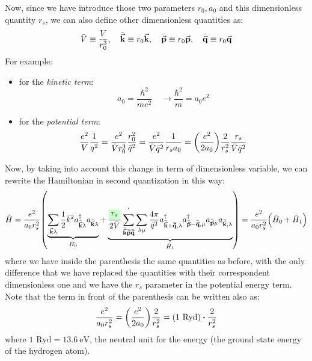 \documentclass[../main/main.tex]{subfiles}
\begin{document}
Now, since we have introduce those two parameters \( r_0,a_0 \) and this dimensionless quantity \( r_s \), we can also define other dimensionless quantities as:
\begin{equation*}
  \bar{V} \equiv \frac{V}{r_0^3}, \quad \bar{\va{k}} \equiv r_0 \va{k}, \quad  \bar{\va{p}} \equiv r_0 \va{p}, \quad \bar{\va{q}} \equiv r_0 \va{q}
\end{equation*}
For example:
\begin{itemize}
\item for the \emph{kinetic term}:
\begin{equation*}
  a_0 = \frac{\hbar ^2}{m e^2} \quad \rightarrow \frac{\hbar ^2}{m} = a_0 e^2
\end{equation*}
\item for the \emph{potential term}:
\begin{equation*}
  \frac{e^2}{V} \frac{1}{q^2} = \frac{e^2}{\bar{V}r_0^3 }\frac{r_0^2}{\bar{q}^2 }
  = \frac{e^2}{\bar{V}\bar{q}^2  }\frac{1}{r_s a_0}
  = \qty(\frac{e^2}{2 a_0}) \frac{2}{r_s^2} \frac{r_s}{\bar{V}\bar{q}^2  }
\end{equation*}
\end{itemize}
Now, by taking into account this change in term of dimensionless variable, we can rewrite the Hamiltonian in second quantization in this way:
\begin{equation}
  \hat{H} = \frac{e^2}{a_0 r_s^2} \qty(\underbrace{\sum_{\va{k} \lambda }^{} \frac{1}{2} \bar{k}^2 a_{\bar{\va{k}} \lambda  } ^\dag  a_{\bar{\va{k}} \lambda  } }_{\hat{H}_0 }
  +  \underbrace{ \frac{ \mathcolorbox{green!20}{r_s}}{2 \bar{V} } \sum_{\bar{\va{k}}\bar{\va{p}} \bar{\va{q}}  }^{'} \sum_{\lambda  \mu }^{} \frac{4 \pi }{\bar{q}^2 } a_{\bar{\va{k}}+\bar{\va{q}}, \lambda   } ^\dag a_{\bar{\va{p}}-\bar{\va{q}}, \mu   } ^\dag  a_{\bar{\va{p}} \mu } a_{\bar{\va{k}}, \lambda  }   }_{\hat{H}_1 }   ) = \frac{e^2}{a_0 r_s^2} \qty( \hat{H}_0 + \hat{H}_1 )
\end{equation}
where we have inside the parenthesis the same quantities as before, with the only difference that we have replaced the quantities with their correspondent dimensionless one and we have the \( r_s \) parameter in the potential energy term.
Note that the term in front of the parenthesis can be written also as:
\begin{equation*}
  \frac{e^2}{a_0 r_s^2} = \qty(\frac{e^2}{2 a_0}) \frac{2}{r_s^2} = \qty(1 \text{ Ryd}) \vdot \frac{2}{r_s^2}
\end{equation*}
where \( 1 \text{ Ryd} = \SI{13.6}{\eV}  \), the neutral unit for the energy (the ground state energy of the hydrogen atom).
\end{document}
